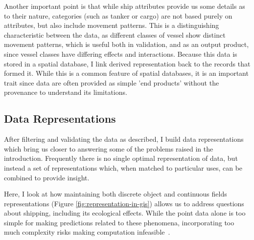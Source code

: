 
Another important point is that while ship attributes provide us some details as to their nature, categories (such as tanker or cargo) are not based purely on attributes, but also include movement patterns. This is a distinguishing characteristic between the data, as different classes of vessel show distinct movement patterns, which is useful both in validation, and as an output product, since vessel classes have differing effects and interactions. Because this data is stored in a spatial database, I link derived representation back to the records that formed it. While this is a common feature of spatial databases, it is an important trait since data are often provided as simple 'end products' without the provenance to understand its limitations.



\subsection{Data Representations}


After filtering and validating the data as described, I build data representations which bring us closer to answering some of the problems raised in the introduction. Frequently there is no single optimal representation of data, but instead a set of representations which, when matched to particular uses, can be combined to provide insight.

Here, I look at how maintaining both discrete object and continuous fields representations (Figure \ref{fig:representation-in-gis}) allows us to address questions about shipping, including its ecological effects. While the point data alone is too simple for making predictions related to these phenomena, incorporating too much complexity risks making computation infeasible~\citep{de2007geospatial}.

